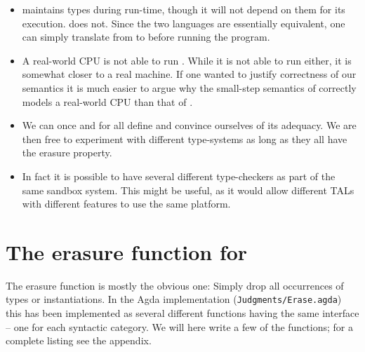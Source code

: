 \begin{itemize}
\item \ATAL maintains types during run-time, though it will not depend on them
  for its execution. \ATALe does not. Since the two languages are essentially
  equivalent, one can simply translate from \ATAL to \ATALe before running the
  program.
\item A real-world CPU is not able to run \ATAL. While it is not able to run
  \ATALe either, it is somewhat closer to a real machine. If one wanted to
  justify correctness of our semantics it is much easier to argue why the
  small-step semantics of \ATALe correctly models a real-world CPU than that of
  \ATAL.
\item We can once and for all define \ATALe and convince ourselves of its
  adequacy. We are then free to experiment with different type-systems as long
  as they all have the erasure property.
\item In fact it is possible to have several different type-checkers as part of
  the same sandbox system. This might be useful, as it would allow different
  TALs with different features to use the same platform.
\end{itemize}

\section{The erasure function for \ATAL}

The erasure function is mostly the obvious one: Simply drop all occurrences of
types or instantiations. In the Agda implementation
(\texttt{Judgments/Erase.agda}) this has been implemented as several different
functions having the same interface -- one for each syntactic category. We will
here write a few of the functions; for a complete listing see the
appendix.

